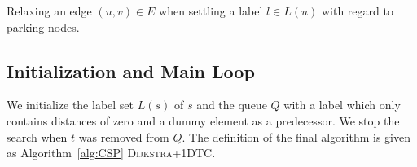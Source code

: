 \begin{algorithm}[htbp]
	\DontPrintSemicolon



	\caption[\textsc{RelaxEdge}]{\label{alg:relax_edge}Relaxing an edge $(u,v) \in E$ when settling a label $l \in L(u)$ with regard to parking nodes.}
\end{algorithm}

\subsection{Initialization and Main Loop}
We initialize the label set $L(s)$ of $s$ and the queue $Q$ with a label which only contains distances of zero and a dummy element as a predecessor. We stop the search when $t$ was removed from $Q$. The definition of the final algorithm is given as Algorithm~\ref{alg:CSP} \textsc{Dijkstra+1DTC}.

